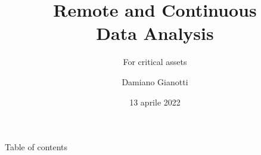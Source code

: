 \documentclass[UKenglish, dvipsnames]{beamer}
\author[Damiano Gianotti]{Damiano Gianotti}
\title{Remote and Continuous\\ Data Analysis}
\subtitle{For critical assets}
\date{13 aprile 2022}
\begin{document}
\begin{frame}{Table of contents}
    \tableofcontents[] %
\end{frame}









% 
\end{document}
